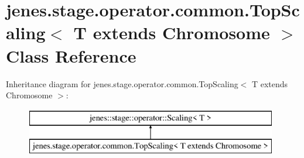 \hypertarget{classjenes_1_1stage_1_1operator_1_1common_1_1_top_scaling_3_01_t_01extends_01_chromosome_01_4}{\section{jenes.\-stage.\-operator.\-common.\-Top\-Scaling$<$ T extends Chromosome $>$ Class Reference}
\label{classjenes_1_1stage_1_1operator_1_1common_1_1_top_scaling_3_01_t_01extends_01_chromosome_01_4}
}
Inheritance diagram for jenes.\-stage.\-operator.\-common.\-Top\-Scaling$<$ T extends Chromosome $>$\-:\begin{figure}[H]
\begin{center}
\leavevmode
\includegraphics[height=2.000000cm]{classjenes_1_1stage_1_1operator_1_1common_1_1_top_scaling_3_01_t_01extends_01_chromosome_01_4}
\end{center}
\end{figure}
